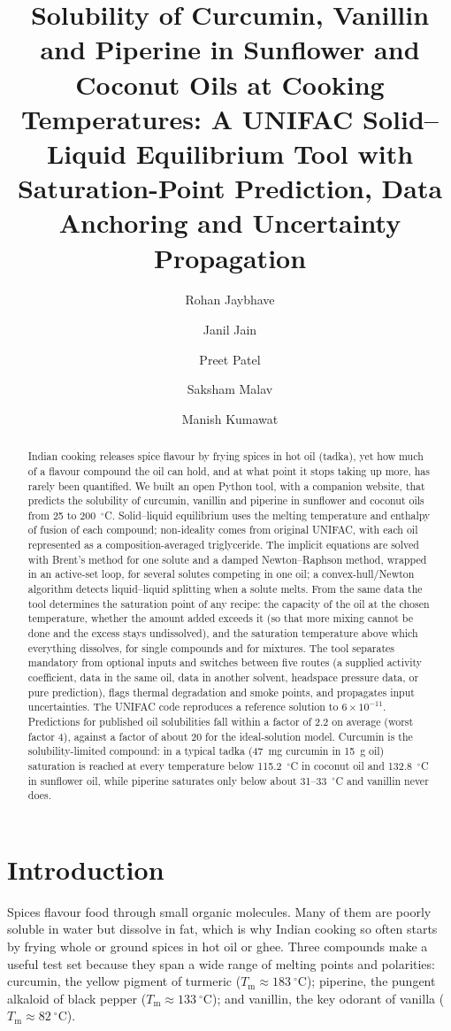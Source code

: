 \documentclass[journal=jceaax,manuscript=article,layout=twocolumn]{achemso}
\title{Solubility of Curcumin, Vanillin and Piperine in Sunflower and Coconut Oils at Cooking Temperatures: A UNIFAC Solid--Liquid Equilibrium Tool with Saturation-Point Prediction, Data Anchoring and Uncertainty Propagation}
\author{Rohan Jaybhave}
\author{Janil Jain}
\author{Preet Patel}
\author{Saksham Malav}
\author{Manish Kumawat}
\affiliation[IIT Gandhinagar]{Department of Chemical Engineering, Indian Institute of Technology Gandhinagar, Palaj, Gandhinagar, Gujarat 382055, India}
\begin{document}
\begin{abstract}
Indian cooking releases spice flavour by frying spices in hot oil (tadka), yet how much of a flavour compound the oil can hold, and at what point it stops taking up more, has rarely been quantified. We built an open Python tool, with a companion website, that predicts the solubility of curcumin, vanillin and piperine in sunflower and coconut oils from 25 to 200~$^\circ$C. Solid--liquid equilibrium uses the melting temperature and enthalpy of fusion of each compound; non-ideality comes from original UNIFAC, with each oil represented as a composition-averaged triglyceride. The implicit equations are solved with Brent's method for one solute and a damped Newton--Raphson method, wrapped in an active-set loop, for several solutes competing in one oil; a convex-hull/Newton algorithm detects liquid--liquid splitting when a solute melts. From the same data the tool determines the saturation point of any recipe: the capacity of the oil at the chosen temperature, whether the amount added exceeds it (so that more mixing cannot be done and the excess stays undissolved), and the saturation temperature above which everything dissolves, for single compounds and for mixtures. The tool separates mandatory from optional inputs and switches between five routes (a supplied activity coefficient, data in the same oil, data in another solvent, headspace pressure data, or pure prediction), flags thermal degradation and smoke points, and propagates input uncertainties. The UNIFAC code reproduces a reference solution to $6\times10^{-11}$. Predictions for published oil solubilities fall within a factor of 2.2 on average (worst factor 4), against a factor of about 20 for the ideal-solution model. Curcumin is the solubility-limited compound: in a typical tadka (47~mg curcumin in 15~g oil) saturation is reached at every temperature below 115.2~$^\circ$C in coconut oil and 132.8~$^\circ$C in sunflower oil, while piperine saturates only below about 31--33~$^\circ$C and vanillin never does.
\end{abstract}

\section{Introduction}
Spices flavour food through small organic molecules. Many of them are poorly soluble in water but dissolve in fat, which is why Indian cooking so often starts by frying whole or ground spices in hot oil or ghee. Three compounds make a useful test set because they span a wide range of melting points and polarities: curcumin, the yellow pigment of turmeric ($T_\mathrm{m}\approx183~^\circ$C); piperine, the pungent alkaloid of black pepper ($T_\mathrm{m}\approx133~^\circ$C); and vanillin, the key odorant of vanilla ($T_\mathrm{m}\approx82~^\circ$C).
\end{document}
